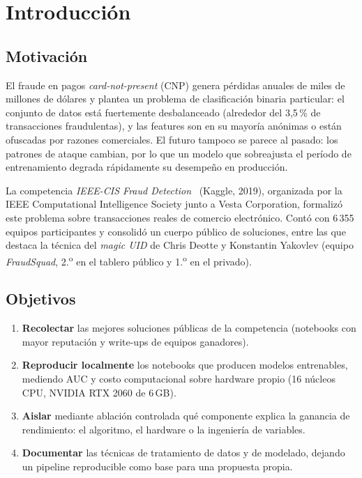 \chapter{Introducción}
\label{cap:intro}

\section{Motivación}

El fraude en pagos \emph{card-not-present} (CNP) genera pérdidas anuales de miles de millones de
dólares y plantea un problema de clasificación binaria particular: el conjunto de datos está
fuertemente desbalanceado (alrededor del 3{,}5\,\% de transacciones fraudulentas), y las features
son en su mayoría anónimas o están ofuscadas por razones comerciales. El futuro tampoco se parece al
pasado: los patrones de ataque cambian, por lo que un modelo que
sobreajusta el período de entrenamiento degrada rápidamente su desempeño en producción.

La competencia \emph{IEEE-CIS Fraud Detection}~\cite{ieee-cis} (Kaggle, 2019), organizada por la
IEEE Computational Intelligence Society junto a Vesta Corporation, formalizó este problema sobre
transacciones reales de comercio electrónico. Contó con 6\,355 equipos participantes y consolidó
un cuerpo público de soluciones, entre las que destaca la técnica del
\emph{magic UID} de Chris Deotte y Konstantin Yakovlev (equipo \emph{FraudSquad}, 2.\textsuperscript{o}
en el tablero público y 1.\textsuperscript{o} en el privado).

\section{Objetivos}

\begin{enumerate}
  \item \textbf{Recolectar} las mejores soluciones públicas de la competencia (notebooks con
        mayor reputación y write-ups de equipos ganadores).
  \item \textbf{Reproducir localmente} los notebooks que producen modelos entrenables, mediendo
        AUC y costo computacional sobre hardware propio (16 núcleos CPU, NVIDIA RTX 2060 de 6\,GB).
  \item \textbf{Aislar} mediante ablación controlada qué componente explica la ganancia de
        rendimiento: el algoritmo, el hardware o la ingeniería de variables.
  \item \textbf{Documentar} las técnicas de tratamiento de datos y de modelado, dejando un
        pipeline reproducible como base para una propuesta propia.
\end{enumerate}


